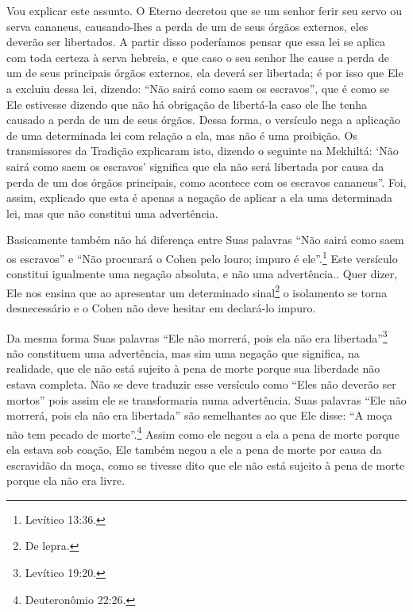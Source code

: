 Vou explicar este assunto. O Eterno decretou que se um senhor ferir seu
servo ou serva cananeus, causando-lhes a perda de um de seus órgãos
externos, eles deverão ser libertados. A partir disso poderíamos pensar
que essa lei se aplica com toda certeza à serva hebreia, e que caso o
seu senhor lhe cause a perda de um de seus principais órgãos externos,
ela deverá ser libertada; é por isso que Ele a excluiu dessa lei,
dizendo: ``Não sairá como saem os escravos'', que é como se Ele
estivesse dizendo que não há obrigação de libertá-la caso ele lhe tenha
causado a perda de um de seus órgãos. Dessa forma, o versículo nega a
aplicação de uma determinada lei com relação a ela, mas não é uma
proibição. Os transmissores da Tradição explicaram isto, dizendo o
seguinte na Mekhiltá: `Não sairá como saem os escravos' significa que
ela não será libertada por causa da perda de um dos órgãos principais,
como acontece com os escravos cananeus''. Foi, assim, explicado que esta
é apenas a negação de aplicar a ela uma determinada lei, mas que não
constitui uma advertência.

Basicamente também não há diferença entre Suas palavras ``Não sairá como saem os escravos'' e ``Não procurará o Cohen pelo louro;
impuro
é ele''.\footnote{Levítico 13:36.} Este versículo constitui igualmente uma
negação absoluta, e não uma advertência.. Quer dizer, Ele nos ensina que ao
apresentar um determinado sinal\footnote{De lepra.} o isolamento se
torna desnecessário e o Cohen não deve hesitar em declará-lo impuro.

Da mesma forma Suas palavras ``Ele não morrerá, pois ela não era
libertada''\footnote{Levítico 19:20.} não constituem uma advertência, mas sim uma
negação que significa, na realidade, que ele não está sujeito à pena de
morte porque sua liberdade não estava completa. Não se deve traduzir
esse versículo como ``Eles não deverão ser mortos'' pois assim ele se
transformaria numa advertência. Suas palavras ``Ele não morrerá, pois
ela não era libertada'' são semelhantes ao que Ele disse: ``A moça não tem pecado de morte''.\footnote{Deuteronômio 22:26.} Assim como ele negou a ela a pena de morte porque
ela estava sob coação, Ele também negou a ele a pena de morte por causa
da escravidão da moça, como se tivesse dito que ele não está sujeito à
pena de morte porque ela não era livre.

